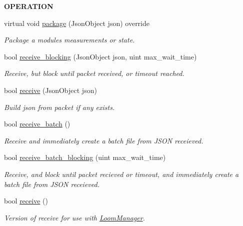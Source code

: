 \begin{Indent}{\bf O\+P\+E\+R\+A\+T\+I\+ON}\par
\begin{DoxyCompactItemize}
\item 
virtual void \hyperlink{class_loom_comm_plat_a4cc05ef1f12c5b15fc6516dc75f070d4}{package} (Json\+Object json) override
\begin{DoxyCompactList}\small\item\em Package a modules measurements or state. \end{DoxyCompactList}\item 
bool \hyperlink{class_loom_comm_plat_a15fb6d65a9454154ac899f3560c67a6f}{receive\+\_\+blocking} (Json\+Object json, uint max\+\_\+wait\+\_\+time)
\begin{DoxyCompactList}\small\item\em Receive, but block until packet received, or timeout reached. \end{DoxyCompactList}\item 
bool \hyperlink{class_loom_comm_plat_a7d5af29f4053627979c15928f284446f}{receive} (Json\+Object json)
\begin{DoxyCompactList}\small\item\em Build json from packet if any exists. \end{DoxyCompactList}\item 
bool \hyperlink{class_loom_comm_plat_ab59a3e7ed1aa0c3997506bf77b1176e6}{receive\+\_\+batch} ()
\begin{DoxyCompactList}\small\item\em Receive and immediately create a batch file from J\+S\+ON receieved. \end{DoxyCompactList}\item 
bool \hyperlink{class_loom_comm_plat_a84aa23d66457ffe78053d3d0cbd1e7b1}{receive\+\_\+batch\+\_\+blocking} (uint max\+\_\+wait\+\_\+time)
\begin{DoxyCompactList}\small\item\em Receive, and block until packet recieved or timeout, and immediately create a batch file from J\+S\+ON receieved. \end{DoxyCompactList}\item 
bool \hyperlink{class_loom_comm_plat_abe9a506341e7e5dd3dde40210d7c3904}{receive} ()
\begin{DoxyCompactList}\small\item\em Version of receive for use with \hyperlink{class_loom_manager}{Loom\+Manager}. \end{DoxyCompactList}\item 

\end{DoxyCompactItemize}
\end{Indent}

